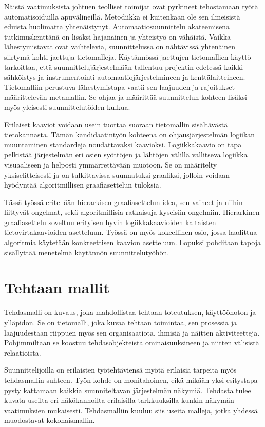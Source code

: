 \documentclass[finnish,12pt]{article}
\begin{document}
Näistä vaatimuksista johtuen teolliset toimijat ovat pyrkineet tehostamaan työtä automatisoiduilla apuvälineillä.
Metodiikka ei kuitenkaan ole sen ilmeisistä eduista huolimatta yhtenäistynyt.
Automaatiosuunnittelu akateemisena tutkimuskenttänä on lisäksi hajanainen ja yhteistyö on vähäistä.
Vaikka lähestymistavat ovat vaihtelevia, suunnittelussa on nähtävissä yhtenäinen siirtymä kohti jaettuja tietomalleja.
Käytännössä jaettujen tietomallien käyttö tarkoittaa, että suunnittelujärjestelmään tallentuu projektin edetessä kaikki sähköistys ja instrumentointi automaatiojärjestelmineen ja kenttälaitteineen.
Tietomalliin perustuva lähestymistapa vaatii sen laajuuden ja rajoitukset määrittelevän metamallin.
Se ohjaa ja määrittää suunnittelun kohteen lisäksi myös yleisesti suunnittelutöiden kulkua.

Erilaiset kaaviot voidaan usein tuottaa suoraan tietomallin sisältävästä tietokannasta.
Tämän kandidaatintyön kohteena on ohjausjärjestelmän logiikan muuntaminen standardeja noudattavaksi kaavioksi.
Logiikkakaavio on tapa pelkistää järjestelmän eri osien syöttöjen ja lähtöjen välillä vallitseva logiikka visuaaliseen ja helposti ymmärrettävään muotoon.
Se on määritelty yksiselitteisesti ja on tulkittavissa suunnatuksi graafiksi, jolloin voidaan hyödyntää algoritmillisen graafiasettelun tuloksia.

Tässä työssä eritellään hierarkisen graafiasettelun idea, sen vaiheet ja niihin liittyvät ongelmat, sekä algoritmillisia ratkaisuja kyseisiin ongelmiin.
Hierarkinen graafiasettelu soveltuu erityisen hyvin logiikkakaavioiden kaltaisten tietovirtakaavioiden asetteluun.
Työssä on myös kokeellinen osio, jossa laadittua algoritmia käytetään konkreettisen kaavion asetteluun.
Lopuksi pohditaan tapoja sisällyttää menetelmä käytännön suunnittelutyöhön.

	\clearpage
	\section{Tehtaan mallit}

Tehdasmalli on kuvaus, joka mahdollistaa tehtaan toteutuksen, käyttöönoton ja ylläpidon.
Se on tietomalli, joka kuvaa tehtaan toimintaa, sen prosessia ja laajuudestaan riippuen myös sen organisaatiota, ihmisiä ja näitten aktiviteetteja.
Pohjimmiltaan se koostuu tehdasobjekteista ominaisuuksineen ja niitten välisistä relaatioista. \cite{RefWorks:41}

Suunnittelijoilla on erilaisten työtehtäviensä myötä erilaisia tarpeita myös tehdasmallin suhteen.
Työn kohde on monitahoinen, eikä mikään yksi esitystapa pysty kattamaan kaikkia suunniteltavan järjestelmän näkymiä.
Tehdasta tulee kuvata useilta eri näkökannoilta erilaisilla tarkkuuksilla kunkin näkymän vaatimuksien mukaisesti.
Tehdasmalliin kuuluu siis useita malleja, jotka yhdessä muodostavat kokonaismallin.
\end{document}
